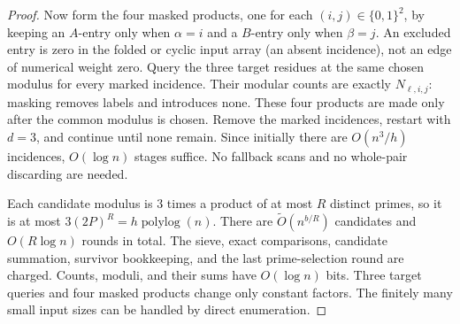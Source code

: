 \documentclass[11pt]{article}
\newcommand{\softO}{\widetilde O}
\begin{document}
\begin{proof}
Now form the four masked products, one for each $(i,j)\in\{0,1\}^2$,
by keeping an $A$-entry only when $\alpha=i$ and a $B$-entry only when
$\beta=j$.  An excluded entry is zero in the folded or cyclic input
array (an absent incidence), not an edge of numerical weight zero.
Query the three target residues at the same chosen modulus
for every marked incidence.  Their modular counts are exactly
$N_{\ell,i,j}$: masking removes labels and introduces none.  These
four products are made only after the common modulus is chosen.
Remove the marked incidences, restart with $d=3$, and continue until
none remain.  Since initially there are $O(n^3/h)$ incidences,
$O(\log n)$ stages suffice.  No fallback scans and no whole-pair
discarding are needed.

Each candidate modulus is $3$ times a product of at most $R$ distinct
primes, so it is at most $3(2P)^R=h\operatorname{polylog}(n)$.
There are $\softO(n^{b/R})$ candidates and $O(R\log n)$ rounds in
total.  The sieve, exact comparisons, candidate summation, survivor
bookkeeping, and the last prime-selection round are charged.  Counts,
moduli, and their sums have $O(\log n)$ bits.  Three target queries and
four masked products change only constant factors.  The finitely many
small input sizes can be handled by direct enumeration.
\end{proof}
\end{document}
